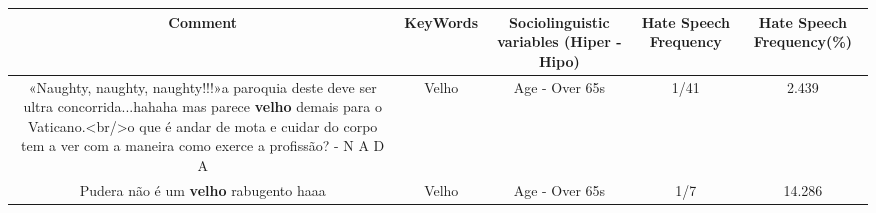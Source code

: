 \documentclass[11pt]{article}
\newlength\mylength
\begin{document}
\begin{center}
\setlength\mylength{\dimexpr\textwidth - 1\arrayrulewidth - 50\tabcolsep}
\begin{longtable}{|C{.65\mylength}|C{.30\mylength}|C{.12\mylength}|C{.12\mylength}|C{.12\mylength}|}
\hline
\textbf{Comment} & \textbf{KeyWords} & \textbf{Sociolinguistic variables (Hiper - Hipo)}  & \textbf{Hate Speech Frequency} & \textbf{Hate Speech Frequency(\%)} \\
\hline{}\small «Naughty, naughty, naughty!!!»a paroquia deste deve ser ultra concorrida...hahaha mas parece \textbf{velho} demais para o Vaticano.<br/>o que é andar de mota e cuidar do corpo tem a ver com a maneira como exerce a profissão? - N A D A\normalsize   & Velho & Age - Over 65s & 1/41 & 2.439 \\  \hline
  \small Pudera não é um \textbf{velho} rabugento haaa\normalsize   & Velho & Age - Over 65s & 1/7 & 14.286 \\  \hline

\end{longtable}
\end{center}
\end{document}

